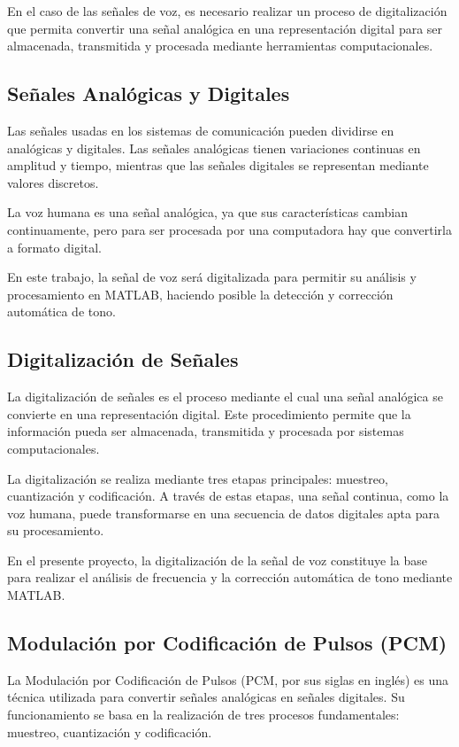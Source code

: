 \documentclass[12pt]{article}
\begin{document}
En el caso de las señales de voz, es necesario realizar un proceso de digitalización que permita convertir una señal analógica en una representación digital para ser almacenada, transmitida y procesada mediante herramientas computacionales.

\subsection{Señales Analógicas y Digitales}

Las señales usadas en los sistemas de comunicación pueden dividirse en analógicas y digitales. Las señales analógicas tienen variaciones continuas en amplitud y tiempo, mientras que las señales digitales se representan mediante valores discretos.

La voz humana es una señal analógica, ya que sus características cambian continuamente, pero para ser procesada por una computadora hay que convertirla a formato digital.

En este trabajo, la señal de voz será digitalizada para permitir su análisis y procesamiento en MATLAB, haciendo posible la detección y corrección automática de tono.

\subsection{Digitalización de Señales}

La digitalización de señales es el proceso mediante el cual una señal analógica se convierte en una representación digital. Este procedimiento permite que la información pueda ser almacenada, transmitida y procesada por sistemas computacionales.

La digitalización se realiza mediante tres etapas principales: muestreo, cuantización y codificación. A través de estas etapas, una señal continua, como la voz humana, puede transformarse en una secuencia de datos digitales apta para su procesamiento.

En el presente proyecto, la digitalización de la señal de voz constituye la base para realizar el análisis de frecuencia y la corrección automática de tono mediante MATLAB.



\subsection{Modulación por Codificación de Pulsos (PCM)}

La Modulación por Codificación de Pulsos (PCM, por sus siglas en inglés) es una técnica utilizada para convertir señales analógicas en señales digitales. Su funcionamiento se basa en la realización de tres procesos fundamentales: muestreo, cuantización y codificación.
\end{document}
